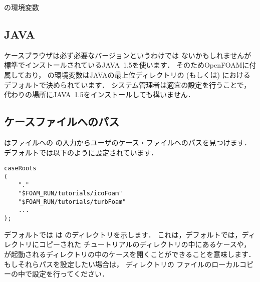 \begin{table}[ht]
 
 \caption{の環境変数}
 \label{tbl:A.3}
\end{table}


\subsection{JAVA}
\label{ssec:A.5.1}
ケースブラウザは必ず必要なバージョンというわけでは
ないかもしれませんが標準でインストールされているJAVA~1.5を使います．
そのためOpenFOAMに付属しており，
%
%
の環境変数はJAVAの最上位ディレクトリの
 (もしくは) における
デフォルトで決められています．
システム管理者は適宜の設定を行うことで，
代わりの場所にJAVA~1.5をインストールしても構いません．


\subsection{ケースファイルへのパス}
\label{ssec:A.5.2}
はファイルへの
の入力からユーザのケース・ファイルへのパスを見つけます．
デフォルトでは以下のように設定されています．
\begin{OFfile}
\begin{verbatim}
caseRoots
(
    "."
    "$FOAM_RUN/tutorials/icoFoam"
    "$FOAM_RUN/tutorials/turbFoam"
    ...
);
\end{verbatim}
\end{OFfile}
デフォルトでは
%
%
は
のディレクトリを示します．
これは，デフォルトでは，ディレクトリにコピーされた
チュートリアルのディレクトリの中にあるケースや，
が起動されるディレクトリの中のケースを開くことができることを意味します．
もしそれらパスを設定したい場合は，
ディレクトリの
ファイルのローカルコピーの中で設定を行ってください．
